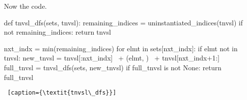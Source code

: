 Now the code.

\begin{minipage}[c]{0.45\textwidth}
\begin{python1}  
def tnvsl_dfs(sets, tnvsl):
  remaining_indices = uninstantiated_indices(tnvsl)
  if not remaining_indices: return tnvsl

  nxt_indx = min(remaining_indices)
  for elmt in sets[nxt_indx]:
    if elmt not in tnvsl:
      new_tnvsl = tnvsl[:nxt_indx] \
                  + (elmt, ) \
                  + tnvsl[nxt_indx+1:]
      full_tnvsl = tnvsl_dfs(sets, new_tnvsl)
      if full_tnvsl is not None: return full_tnvsl
\end{python1}\linv
\begin{lstlisting} [caption={\textit{tnvsl\_dfs}}]
\end{lstlisting}
\end{minipage}

